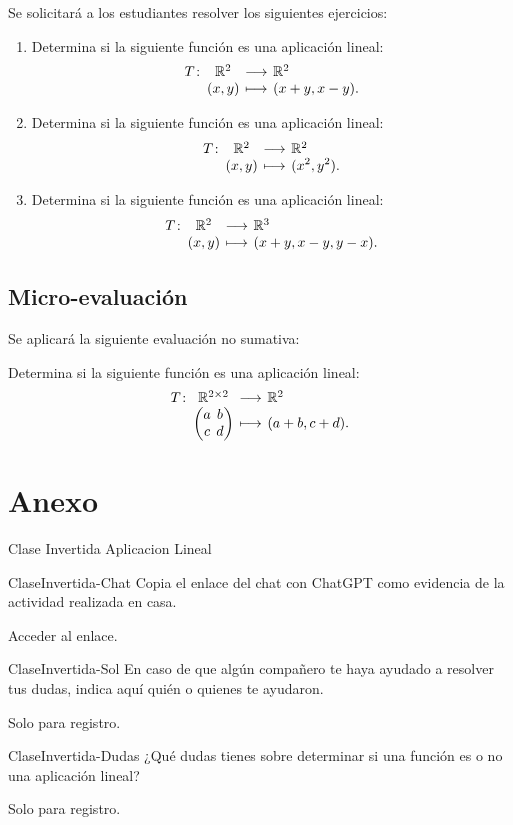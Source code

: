 \documentclass[a4,11pt]{aleph-notas}
\begin{document}
Se solicitará a los estudiantes resolver los siguientes ejercicios:
\begin{enumerate}
    \item 
        Determina si la siguiente función es una aplicación lineal:
        \[
            \funcion{T}{\R^2}{\R^2}{(x,y)}{(x+y, x-y).}
        \]
    \item 
        Determina si la siguiente función es una aplicación lineal:
        \[
            \funcion{T}{\R^2}{\R^2}{(x,y)}{(x^2, y^2).}
        \]
    \item 
        Determina si la siguiente función es una aplicación lineal:
        \[
            \funcion{T}{\R^2}{\R^3}{(x,y)}{(x+y, x-y, y-x).}
        \]
\end{enumerate}

\subsection{Micro-evaluación}

Se aplicará la siguiente evaluación no sumativa:

    Determina si la siguiente función es una aplicación lineal:
    \[
        \funcion{T}{\R^{2\times 2}}{\R^2}{\begin{pmatrix} a & b \\ c & d \end{pmatrix}}{(a+b, c+d).}
    \]

\section*{Anexo}


\begin{quiz}{Clase Invertida Aplicacion Lineal}
    
\begin{essay}[response format=text, response field lines=5]%
    {ClaseInvertida-Chat}
    Copia el enlace del chat con ChatGPT como evidencia de la actividad realizada en casa.
    \item Acceder al enlace.
\end{essay}

\begin{essay}[response format=text, response field lines=5]%
    {ClaseInvertida-Sol}
    En caso de que algún compañero te haya ayudado a resolver tus dudas, indica aquí quién o quienes te ayudaron.
    \item Solo para registro.
\end{essay}

\begin{essay}[response format=text, response field lines=5]%
    {ClaseInvertida-Dudas}
    ¿Qué dudas tienes sobre determinar si una función es o no una aplicación lineal?
    \item Solo para registro.
\end{essay}



\end{quiz}
\end{document}
